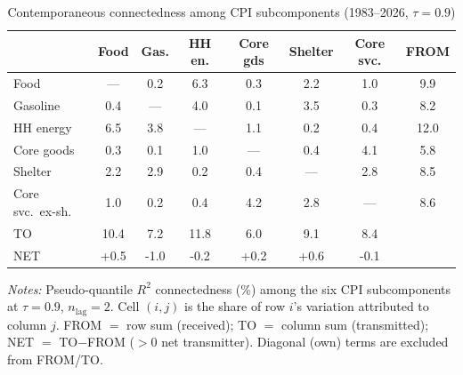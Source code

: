 \begin{table}[!ht]
\centering
\caption{Contemporaneous connectedness among CPI subcomponents (1983--2026, $\tau=0.9$)}
\label{tab:connccore}
\setlength{\tabcolsep}{4pt}\footnotesize
\begin{threeparttable}
\begin{tabular}{l c c c c c c c}
\toprule
 & Food & Gas. & HH en. & Core gds & Shelter & Core svc. & FROM \\
\midrule
Food & --- & 0.2 & 6.3 & 0.3 & 2.2 & 1.0 & 9.9 \\
Gasoline & 0.4 & --- & 4.0 & 0.1 & 3.5 & 0.3 & 8.2 \\
HH energy & 6.5 & 3.8 & --- & 1.1 & 0.2 & 0.4 & 12.0 \\
Core goods & 0.3 & 0.1 & 1.0 & --- & 0.4 & 4.1 & 5.8 \\
Shelter & 2.2 & 2.9 & 0.2 & 0.4 & --- & 2.8 & 8.5 \\
Core svc.\ ex-sh. & 1.0 & 0.2 & 0.4 & 4.2 & 2.8 & --- & 8.6 \\
\midrule
TO & 10.4 & 7.2 & 11.8 & 6.0 & 9.1 & 8.4 &  \\
NET & +0.5 & -1.0 & -0.2 & +0.2 & +0.6 & -0.1 &  \\
\bottomrule
\end{tabular}
\begin{tablenotes}[flushleft]\footnotesize
\item \textit{Notes:} Pseudo-quantile $R^2$ connectedness (\%) among the six CPI subcomponents at $\tau=0.9$, $n_{\text{lag}}=2$. Cell $(i,j)$ is the share of row $i$'s variation attributed to column $j$. FROM $=$ row sum (received); TO $=$ column sum (transmitted); NET $=$ TO$-$FROM ($>0$ net transmitter). Diagonal (own) terms are excluded from FROM/TO.
\end{tablenotes}
\end{threeparttable}
\end{table}

